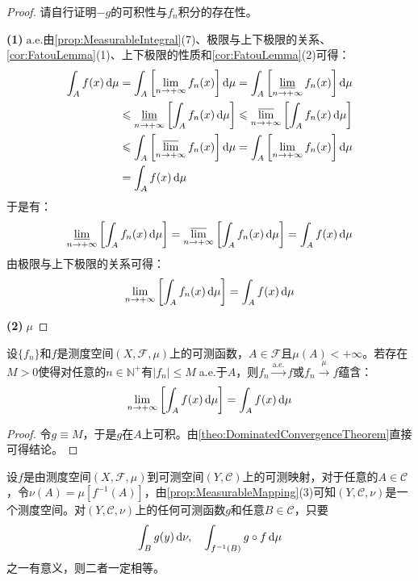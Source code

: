 \begin{proof}
	请自行证明$-g$的可积性与$f_n$积分的存在性。\par
	\textbf{(1)$\;\text{a.e.}$}由\cref{prop:MeasurableIntegral}(7)、极限与上下极限的关系、\cref{cor:FatouLemma}(1)、上下极限的性质和\cref{cor:FatouLemma}(2)可得：
	\begin{align*}
		\int_{A}f(x)\dif\mu&=\int_{A}\left[\lim_{n\to+\infty}f_n(x)\right]\dif\mu=\int_{A}\left[\varliminf_{n\to+\infty}f_n(x)\right]\dif\mu \\
		&\leqslant\varliminf_{n\to+\infty}\left[\int_{A}f_n(x)\dif\mu\right]\leqslant\varlimsup_{n\to+\infty}\left[\int_{A}f_n(x)\dif\mu\right] \\
		&\leqslant\int_{A}\left[\varlimsup_{n\to+\infty}f_n(x)\right]\dif\mu=\int_{A}\left[\lim_{n\to+\infty}f_n(x)\right]\dif\mu \\
		&=\int_{A}f(x)\dif\mu
	\end{align*}
	于是有：
	\begin{equation*}
		\varliminf_{n\to+\infty}\left[\int_{A}f_n(x)\mathop{}\!\mathrm{d}\mu\right]=\varlimsup_{n\to+\infty}\left[\int_{A}f_n(x)\mathop{}\!\mathrm{d}\mu\right]=\int_{A}f(x)\mathop{}\!\mathrm{d}\mu
	\end{equation*}
	由极限与上下极限的关系可得：
	\begin{equation*}
		\lim_{n\to+\infty}\left[\int_{A}f_n(x)\mathop{}\!\mathrm{d}\mu\right]=\int_{A}f(x)\mathop{}\!\mathrm{d}\mu
	\end{equation*}\par
	\textbf{(2)$\;\mu$}
\end{proof}
\begin{corollary}[Lebesgue有界收敛定理]
	设$\{f_n\}$和$f$是测度空间$(X,\mathscr{F},\mu)$上的可测函数，$A\in\mathscr{F}$且$\mu(A)<+\infty$。若存在$M>0$使得对任意的$n\in\mathbb{N}^+$有$|f_n|\leqslant M\;$a.e.于$A$，则$f_n\overset{\text{a.e.}}{\longrightarrow}f$或$f_n\overset{\mu}{\longrightarrow}f$蕴含：
	\begin{equation*}
		\lim_{n\to+\infty}\left[\int_{A}f(x)\mathop{}\!\mathrm{d}\mu\right]=\int_{A}f(x)\mathop{}\!\mathrm{d}\mu
	\end{equation*}
\end{corollary}
\begin{proof}
	令$g\equiv M$，于是$g$在$A$上可积。由\cref{theo:DominatedConvergenceTheorem}直接可得结论。
\end{proof}
\begin{theorem}\label{theo:IntBySubstitution}
	设$f$是由测度空间$(X,\mathscr{F},\mu)$到可测空间$(Y,\mathscr{C})$上的可测映射，对于任意的$A\in\mathscr{C}$，令$\nu(A)=\mu[f^{-1}(A)]$，由\cref{prop:MeasurableMapping}(3)可知$(Y,\mathscr{C},\nu)$是一个测度空间。对$(Y,\mathscr{C},\nu)$上的任何可测函数$g$和任意$B\in\mathscr{C}$，只要
	\begin{equation*}
		\int_Bg(y)\mathop{}\!\mathrm{d}\nu,\quad\int_{f^{-1}(B)}g\circ f\mathop{}\!\mathrm{d}\mu
	\end{equation*}
	之一有意义，则二者一定相等。
\end{theorem}
